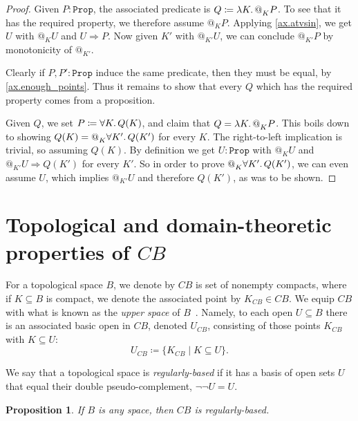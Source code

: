 \documentclass[11pt, oneside, article]{memoir}
\makeatletter
\theoremstyle{plain}
\newtheorem{proposition}[theorem]{Proposition}
\theoremstyle{definition}
\theoremstyle{remark}
\renewcommand{\ss}{\subseteq}
\newcommand{\const}[1]{\mathtt{#1}}
\newcommand{\Prop}{\const{Prop}}
\newcommand{\BaseSpace}{B}
\newcommand{\AtSymbol}{{@}}
\newcommand{\At}[2][]{\AtSymbol^{#1}_{#2}}
\newcommand{\imp}{\Rightarrow}
\makeatother
\begin{document}
\begin{proof}
Given $P : \Prop$, the associated predicate is $Q \coloneqq \lambda K \ldotp \At{K} P$. To see that it has the required property, we therefore assume $\At{K} P$. Applying \cref{ax.atvsin}, we get $U$ with $\At{K} U$ and $U \imp P$. Now given $K'$ with $\At{K'} U$, we can conclude $\At{K'} P$ by monotonicity of $\At{K'}$.

Clearly if $P, P' : \Prop$ induce the same predicate, then they must be equal, by \cref{ax.enough_points}. Thus it remains to show that every $Q$ which has the required property comes from a proposition.

Given $Q$, we set $P \coloneqq \forall K \ldotp Q(K)$, and claim that $Q = \lambda K \ldotp \At{K} P$. This boils down to showing $Q(K) = \At{K} \forall K' \ldotp Q(K')$ for every $K$. The right-to-left implication is trivial, so assuming $Q(K)$. By definition we get $U : \Prop$ with $\At{K} U$ and $\At{K'} U \imp Q(K')$ for every $K'$. So in order to prove $\At{K} \forall K' \ldotp Q(K')$, we can even assume $U$, which implies $\At{K'} U$ and therefore $Q(K')$, as was to be shown.
\end{proof}

\section{Topological and domain-theoretic properties of $C\BaseSpace$}

For a topological space $\BaseSpace$, we denote by $C\BaseSpace$ is set of nonempty compacts, where if $K\ss\BaseSpace$ is compact, we denote the associated point by $K_{C\BaseSpace}\in C\BaseSpace$. We equip $C\BaseSpace$ with what is known as the \emph{upper space} of $B$~\cite{Edalat:1995a}. Namely, to each open $U\subseteq \BaseSpace$ there is an associated basic open in $C\BaseSpace$, denoted $U_{C\BaseSpace}$, consisting of those points $K_{C\BaseSpace}$ with $K\subseteq U$:
\[
U_{C\BaseSpace}\coloneqq\{K_{C\BaseSpace}\mid K\ss U\}.
\]

We say that a topological space is \emph{regularly-based} if it has a basis of open sets $U$ that equal their double pseudo-complement, $\neg\neg U=U$.

\begin{proposition}
If $\BaseSpace$ is any space, then $C\BaseSpace$ is regularly-based.
\end{proposition}
\end{document}
